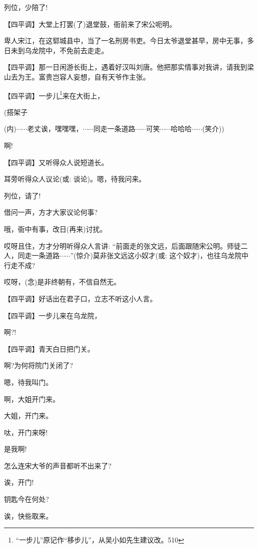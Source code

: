 {列位，少陪了!}

\setlength{\hangindent}{60pt} {【四平调】大堂上打罢(了)退堂鼓，衙前来了宋公呃明。}

{卑人宋江，在这郓城县中，当了一名刑房书吏。今日太爷退堂甚早，房中无事，多日未到乌龙院中，不免前去走走。}

\setlength{\hangindent}{60pt} {【四平调】那一日闲游长街上，遇着好汉叫刘唐。他把那实情事对我讲，请我到梁山去为王。富贵岂容人妄想，自有天爷作主张。}

\setlength{\hangindent}{60pt} {【四平调】一步儿}\footnote{ ``一步儿''原记作``移步儿''，从吴小如先生建议改。{510}}{来在大街上，}

{(搭架子

({\akai 内})$\cdots{}\cdots{}$老丈诶，嘿嘿嘿，$\cdots{}\cdots{}$同走一条道路$\cdots{}\cdots{}$可笑$\cdots{}\cdots{}$哈哈哈$\cdots{}\cdots{}$(笑介))}

{啊!}

\setlength{\hangindent}{60pt} {【四平调】又听得众人说短道长。}

{耳旁听得众人议论({\akai 或}: 谈论)。嗯，待我问来。}

{列位，请了!}

{借问一声，方才大家议论何事?}

{哦，衙中有事，改日(再来)讨扰。}

{哎呀且住，方才分明听得众人言讲: ``前面走的张文远，后面跟随宋公明。师徒二人，同走一条道路$\cdots{}\cdots{}$''(惊介)莫非张文远这小奴才({\akai 或}: 这个奴才)，也往乌龙院中行走不成?}

{哎呀，({\akai 念})是非终朝有，不信自然无。}

\setlength{\hangindent}{60pt} {【四平调】好话出在君子口，立志不听这小人言。}

\setlength{\hangindent}{60pt} {【四平调】一步儿来在乌龙院，}

{啊?!}

\setlength{\hangindent}{60pt} {【四平调】青天白日把门关。}

{啊?为何将院门关闭了?}

{嗯，待我叫门。}

{啊，大姐开门来。}

{大姐，开门来。}

{呔，开门来呀!}

{是我啊!}

{怎么连宋大爷的声音都听不出来了?}

{诶，开门!}

{钥匙今在何处?}

{诶，快些取来。}

